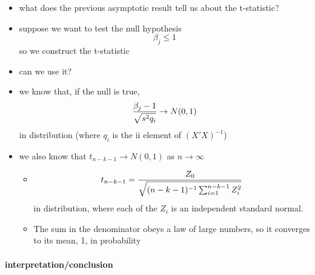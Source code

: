 \begin{itemize}
\item what does the previous asymptotic result tell us about the t-statistic?
\item suppose we want to test the null hypothesis
         \[ \beta_j \leq 1 \] so we construct the t-statistic
\item can we use it?
\item we know that, if the null is true,
         \[ {\beta_j - 1 \over \sqrt{s^2 q_i}} \to N(0,1) \] in
         distribution (where $q_i$ is the ii element of $(X'X)^{-1}$)
\item we also know that $t_{n-k-1} \to N(0,1)$ as $n\to\infty$
\begin{itemize}
\item \[t_{n-k-1} = {Z_0 \over \sqrt{(n-k-1)^{-1} \sum_{i=1}^{n-k-1}
           Z_i^2}}\] in distribution, where each of the $Z_i$ is an
           independent standard normal.
\item The sum in the denominator obeys a law of large numbers, so
           it converges to its mean, 1, in probability
\end{itemize}
\end{itemize}
\paragraph{interpretation/conclusion}
\label{sec-3-1-1-2}

